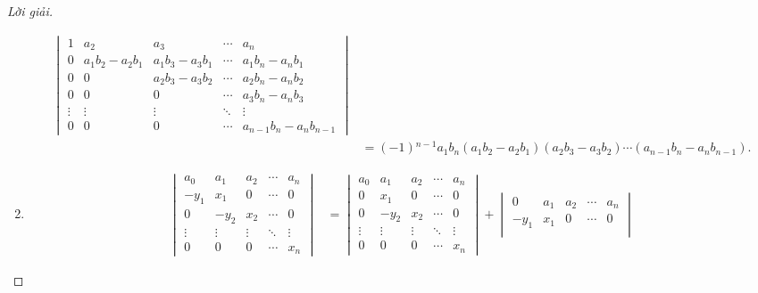 \documentclass[class=linear-algebra,crop=false]{standalone}
\begin{document}
\begin{proof}[Lời giải]
\begin{enumerate}[label = (\alph*)]
\begin{align*}
\begin{vmatrix}
				      1      & a_{2}                   & a_{3}                   & \cdots & a_{n}                       \\
				      0      & a_{1}b_{2} - a_{2}b_{1} & a_{1}b_{3} - a_{3}b_{1} & \cdots & a_{1}b_{n} - a_{n}b_{1}     \\
				      0      & 0                       & a_{2}b_{3} - a_{3}b_{2} & \cdots & a_{2}b_{n} - a_{n}b_{2}     \\
				      0      & 0                       & 0                       & \cdots & a_{3}b_{n} - a_{n}b_{3}     \\
				      \vdots & \vdots                  & \vdots                  & \ddots & \vdots                      \\
				      0      & 0                       & 0                       & \cdots & a_{n-1}b_{n} - a_{n}b_{n-1}
			      \end{vmatrix} \\
			       & =
			      (-1){}^{n-1}a_{1}b_{n}(a_{1}b_{2} - a_{2}b_{1})(a_{2}b_{3} - a_{3}b_{2})\cdots (a_{n-1}b_{n} - a_{n}b_{n-1}).
		      \end{align*}
		\item
		      \begin{align*}
			      \begin{vmatrix}
				      a_{0}  & a_{1}  & a_{2}  & \cdots & a_{n}  \\
				      -y_{1} & x_{1}  & 0      & \cdots & 0      \\
				      0      & -y_{2} & x_{2}  & \cdots & 0      \\
				      \vdots & \vdots & \vdots & \ddots & \vdots \\
				      0      & 0      & 0      & \cdots & x_{n}
			      \end{vmatrix}
			       & =
			      \begin{vmatrix}
				      a_{0}  & a_{1}  & a_{2}  & \cdots & a_{n}  \\
				      0      & x_{1}  & 0      & \cdots & 0      \\
				      0      & -y_{2} & x_{2}  & \cdots & 0      \\
				      \vdots & \vdots & \vdots & \ddots & \vdots \\
				      0      & 0      & 0      & \cdots & x_{n}
			      \end{vmatrix}
			      +
			      \begin{vmatrix}
				      0      & a_{1}  & a_{2}  & \cdots & a_{n}  \\
				      -y_{1} & x_{1}  & 0      & \cdots & 0      \\

\end{vmatrix}
\end{align*}
\end{enumerate}
\end{proof}
\end{document}
